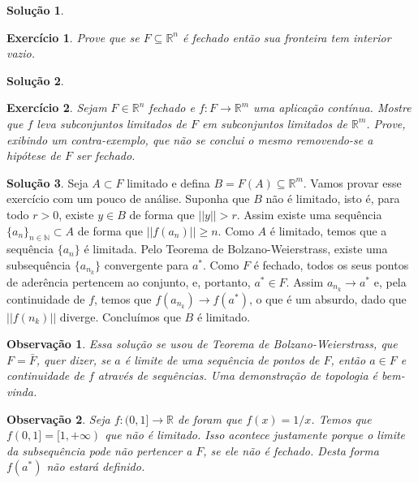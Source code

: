 \documentclass[a4paper,12pt]{article}
\newcommand{\R}{\mathbb{R}}
\theoremstyle{exer}
\newtheorem{exercise}{Exercício}
\theoremstyle{definition}
\newtheorem{solution}{Solução}
\theoremstyle{plain}
\newtheorem{remark}{Observação}
\begin{document}
\begin{solution}

\end{solution}

\begin{exercise}
    Prove que se $F \subseteq \R^n$ é fechado então sua fronteira tem interior vazio.
\end{exercise}

\begin{solution}

\end{solution}

\begin{exercise}
    Sejam $F \in \R^n$ fechado e $f : F \to \R^m$ uma aplicação contínua.
    Mostre que $f$ leva subconjuntos limitados de $F$ em subconjuntos
    limitados de $\R^m$. Prove, exibindo um contra-exemplo, que não se conclui o mesmo removendo-se a hipótese de $F$ ser fechado.
\end{exercise}

\begin{solution}
    Seja $A \subset F$ limitado e defina $B = F(A) \subseteq \R^m$. Vamos
    provar esse exercício com um pouco de análise. Suponha que $B$ não é
    limitado, isto é, para todo $r > 0$, existe $y \in B$ de forma que $||y||
    > r$. Assim existe uma sequência $\{a_n\}_{n \in \mathbb{N}} \subset
    A$ de forma que $||f(a_n)|| \ge n$. Como $A$ é limitado, temos que a
    sequência $\{a_n\}$ é limitada. Pelo Teorema de Bolzano-Weierstrass,
    existe uma subsequência $\{a_{n_k}\}$ convergente para $a^*$. Como $F$ é fechado, todos os seus pontos de aderência pertencem ao
    conjunto, e, portanto, $a^* \in F$. Assim $a_{n_k} \to a^*$ e, pela
    continuidade de $f$, temos que $f(a_{n_k}) \to f(a^*)$, o que é um
    absurdo, dado que $||f(n_k)||$ diverge. Concluímos que $B$ é limitado.
\end{solution}

\begin{remark}
    Essa solução se usou de Teorema de Bolzano-Weierstrass, que $F =
    \bar{F}$, quer dizer, se $a$ é limite de uma sequência de pontos de $F$,
    então $a \in F$ e continuidade de $f$ através de sequências. Uma
    demonstração de topologia é bem-vinda. 
\end{remark}

\begin{remark}
    Seja $f : (0,1] \to \R$ de foram que $f(x) = 1/x$. Temos que $f(0,1] = [1,
    + \infty)$ que não é limitado. Isso acontece justamente porque o limite da
    subsequência pode não pertencer a $F$, se ele não é fechado. Desta forma
    $f(a^*)$ não estará definido. 
\end{remark}
\end{document}
